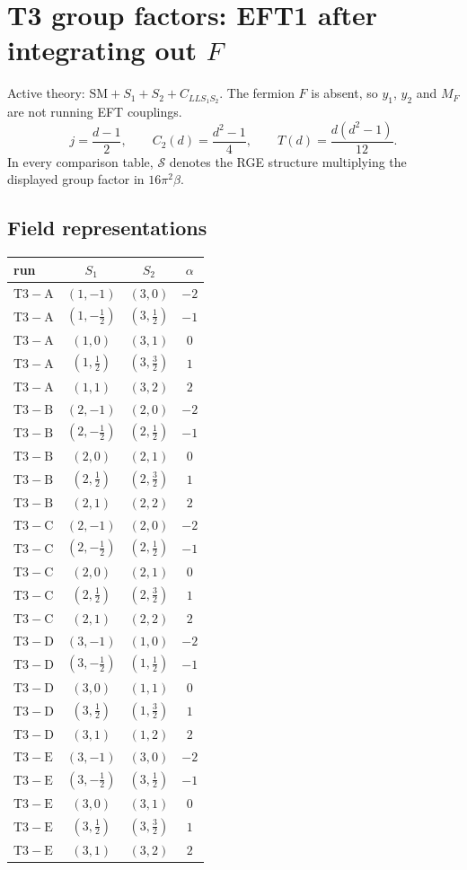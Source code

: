 \documentclass[9pt]{article}
\begin{document}
\section*{T3 group factors: EFT1 after integrating out $F$}
Active theory: $\mathrm{SM}+S_1+S_2+C_{LLS_1S_2}$.  The fermion $F$ is absent, so $y_1$, $y_2$ and $M_F$ are not running EFT couplings.
\[j=\frac{d-1}{2},\qquad C_2(d)=\frac{d^2-1}{4},\qquad T(d)=\frac{d(d^2-1)}{12}.\]
In every comparison table, $\mathcal{S}$ denotes the RGE structure multiplying the displayed group factor in $16\pi^2\beta$.
\subsection*{Field representations}
\begin{longtable}{@{}lccc@{}}
\toprule
run & $S_1$ & $S_2$ & $\alpha$ \\
\midrule
$\mathrm{T3-A}$ & $(1,-1)$ & $(3,0)$ & $-2$ \\
$\mathrm{T3-A}$ & $(1,- \frac{1}{2})$ & $(3,\frac{1}{2})$ & $-1$ \\
$\mathrm{T3-A}$ & $(1,0)$ & $(3,1)$ & $0$ \\
$\mathrm{T3-A}$ & $(1,\frac{1}{2})$ & $(3,\frac{3}{2})$ & $1$ \\
$\mathrm{T3-A}$ & $(1,1)$ & $(3,2)$ & $2$ \\
$\mathrm{T3-B}$ & $(2,-1)$ & $(2,0)$ & $-2$ \\
$\mathrm{T3-B}$ & $(2,- \frac{1}{2})$ & $(2,\frac{1}{2})$ & $-1$ \\
$\mathrm{T3-B}$ & $(2,0)$ & $(2,1)$ & $0$ \\
$\mathrm{T3-B}$ & $(2,\frac{1}{2})$ & $(2,\frac{3}{2})$ & $1$ \\
$\mathrm{T3-B}$ & $(2,1)$ & $(2,2)$ & $2$ \\
$\mathrm{T3-C}$ & $(2,-1)$ & $(2,0)$ & $-2$ \\
$\mathrm{T3-C}$ & $(2,- \frac{1}{2})$ & $(2,\frac{1}{2})$ & $-1$ \\
$\mathrm{T3-C}$ & $(2,0)$ & $(2,1)$ & $0$ \\
$\mathrm{T3-C}$ & $(2,\frac{1}{2})$ & $(2,\frac{3}{2})$ & $1$ \\
$\mathrm{T3-C}$ & $(2,1)$ & $(2,2)$ & $2$ \\
$\mathrm{T3-D}$ & $(3,-1)$ & $(1,0)$ & $-2$ \\
$\mathrm{T3-D}$ & $(3,- \frac{1}{2})$ & $(1,\frac{1}{2})$ & $-1$ \\
$\mathrm{T3-D}$ & $(3,0)$ & $(1,1)$ & $0$ \\
$\mathrm{T3-D}$ & $(3,\frac{1}{2})$ & $(1,\frac{3}{2})$ & $1$ \\
$\mathrm{T3-D}$ & $(3,1)$ & $(1,2)$ & $2$ \\
$\mathrm{T3-E}$ & $(3,-1)$ & $(3,0)$ & $-2$ \\
$\mathrm{T3-E}$ & $(3,- \frac{1}{2})$ & $(3,\frac{1}{2})$ & $-1$ \\
$\mathrm{T3-E}$ & $(3,0)$ & $(3,1)$ & $0$ \\
$\mathrm{T3-E}$ & $(3,\frac{1}{2})$ & $(3,\frac{3}{2})$ & $1$ \\
$\mathrm{T3-E}$ & $(3,1)$ & $(3,2)$ & $2$ \\
\bottomrule
\end{longtable}
\end{document}
